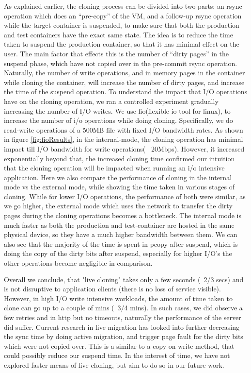 As explained earlier, the cloning process can be divided into two parts: an rsync operation which does an ``pre-copy'' of the VM, and a follow-up rsync operation while the target container is suspended, to make sure that both the production and test containers have the exact same state.
The idea is to reduce the time taken to suspend the production container, so that it has minimal effect on the user.
The main factor that effects this is the number of ``dirty pages'' in the suspend phase, which have not copied over in the pre-commit rsync operation.
Naturally, the number of write operations, and in memory pages in the container while cloning the container, will increase the number of dirty pages, and increase the time of the suspend operation.
To understand the impact that I/O operations have on the cloning operation, we ran a controlled experiment gradually increasing the number of I/O writes. 
We use fio(flexible io tool for linux)\cite{fio}, to increase the number of i/o operations while doing cloning. 
Specifically, we do read-write operations of a 500MB file with fixed I/O bandwidth rates.
As shown in figure \ref{fig:fioResults}, in the internal-mode, the cloning operation has minimal impact till I/O bandwidth for write operations(~ 20Mbps). 
However, it increased exponentially beyond that, the increased cloning time confirmed our intuition that the cloning operation will be impacted when running an i/o intensive application.
Here we also compare the performance of cloning in the internal mode vs the external mode, while showing the time taken in various stages of cloning.
While for lower I/O operations, the performance of both were similar, as we go higher, the external mode which uses the network to transfer the dirty pages during the cloning operations becomes a bottleneck. 
The internal mode is much faster as both the production and test-container are hosted in the same physical device, so they have a much higher bandwidth between them.
We can also see that the majority of the time is spent in pcopy after suspend, which is doing the copy of the dirty bits after suspend, especially for higher I/O's the other operations become negligible in comparison.

Overall we conclude, that "live cloning" takes only a few seconds (~2/3 secs) and is not disruptive to application clients (there is no loss of service visible). 
However, in high I/O write intensive workloads, the amount of time taken to clone can go up to a couple of mins (~3/4 mins).
In such cases, we did observe a few retries and in http but no timeouts, naturally the performance of the server did suffer. 
Current research in live migration has looked into further decreasing the sync time by doing active migration, and trigger page fault for the dirty bits which were not copied over.
This is a similar to a copy-on-write method, that could possibly reduce our suspend time.
In the interest of time, we have not explored faster means of live cloning, but aim to do so in our future work.

